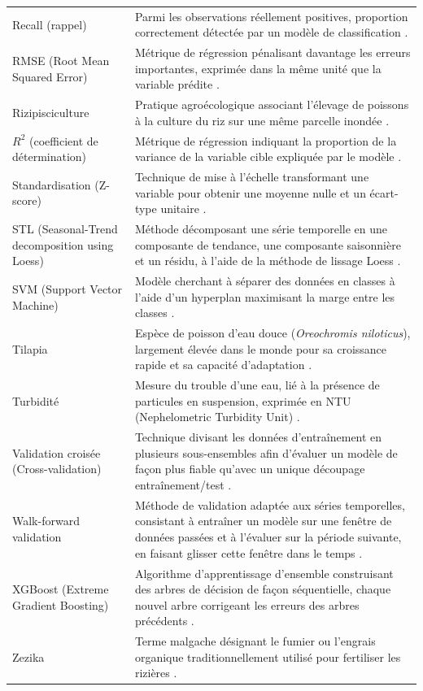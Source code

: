 \documentclass[a4paper,12pt, oneside]{article}
\begin{document}
\begin{longtable}{@{}p{4cm}p{13cm}@{}}
Recall (rappel) & Parmi les observations réellement positives, proportion correctement détectée par un modèle de classification \cite{scikitlearn}. \\[24pt]
RMSE (Root Mean Squared Error) & Métrique de régression pénalisant davantage les erreurs importantes, exprimée dans la même unité que la variable prédite \cite{fpp3}. \\[24pt]
Rizipisciculture & Pratique agroécologique associant l'élevage de poissons à la culture du riz sur une même parcelle inondée \cite{apdra2023}. \\[24pt]
$R^2$ (coefficient de détermination) & Métrique de régression indiquant la proportion de la variance de la variable cible expliquée par le modèle \cite{scikitlearn}. \\[24pt]
Standardisation (Z-score) & Technique de mise à l'échelle transformant une variable pour obtenir une moyenne nulle et un écart-type unitaire \cite{scikitlearn}. \\[24pt]
STL (Seasonal-Trend decomposition using Loess) & Méthode décomposant une série temporelle en une composante de tendance, une composante saisonnière et un résidu, à l'aide de la méthode de lissage Loess \cite{cleveland1990,statsmodelsdoc}. \\[36pt]
SVM (Support Vector Machine) & Modèle cherchant à séparer des données en classes à l'aide d'un hyperplan maximisant la marge entre les classes \cite{cortesvapnik1995}. \\[36pt]
Tilapia & Espèce de poisson d'eau douce (\textit{Oreochromis niloticus}), largement élevée dans le monde pour sa croissance rapide et sa capacité d'adaptation \cite{faotilapia}. \\[24pt]
Turbidité & Mesure du trouble d'une eau, lié à la présence de particules en suspension, exprimée en NTU (Nephelometric Turbidity Unit) \cite{usgsturbidity}. \\[24pt]
Validation croisée (Cross-validation) & Technique divisant les données d'entraînement en plusieurs sous-ensembles afin d'évaluer un modèle de façon plus fiable qu'avec un unique découpage entraînement/test \cite{scikitlearn}. \\[36pt]
Walk-forward validation & Méthode de validation adaptée aux séries temporelles, consistant à entraîner un modèle sur une fenêtre de données passées et à l'évaluer sur la période suivante, en faisant glisser cette fenêtre dans le temps \cite{fpp3}. \\[36pt]
XGBoost (Extreme Gradient Boosting) & Algorithme d'apprentissage d'ensemble construisant des arbres de décision de façon séquentielle, chaque nouvel arbre corrigeant les erreurs des arbres précédents \cite{chenguestrin2016}. \\[24pt]
Zezika & Terme malgache désignant le fumier ou l'engrais organique traditionnellement utilisé pour fertiliser les rizières \cite{apdra2023}. \\[36pt]
\end{longtable}
\end{document}
